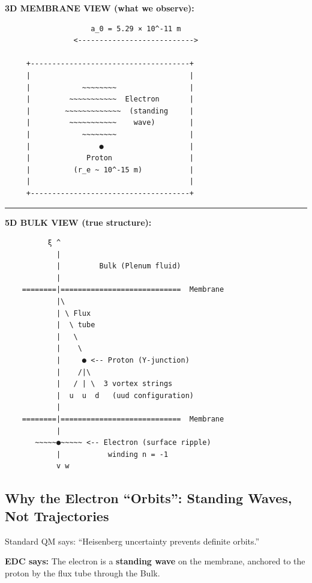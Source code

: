 \begin{tcolorbox}[colback=white,colframe=black,title=\textbf{HYDROGEN ATOM: 3D vs 5D VIEW}]

\textbf{3D MEMBRANE VIEW (what we observe):}
\begin{verbatim}
                    a_0 = 5.29 × 10^-11 m
                <--------------------------->
                
     +-------------------------------------+
     |                                     |
     |            ~~~~~~~~                 |
     |         ~~~~~~~~~~~  Electron       |
     |        ~~~~~~~~~~~~~  (standing     |
     |         ~~~~~~~~~~~    wave)        |
     |            ~~~~~~~~                 |
     |                ●                    |
     |             Proton                  |
     |          (r_e ~ 10^-15 m)           |
     |                                     |
     +-------------------------------------+
\end{verbatim}

\rule{\textwidth}{0.4pt}

\textbf{5D BULK VIEW (true structure):}
\begin{verbatim}
          ξ ^
            |
            |         Bulk (Plenum fluid)
            |
    ========|============================  Membrane
            |\
            | \ Flux
            |  \ tube
            |   \
            |    \
            |     ● <-- Proton (Y-junction)
            |    /|\
            |   / | \  3 vortex strings
            |  u  u  d   (uud configuration)
            |
    ========|============================  Membrane
            |
       ~~~~~●~~~~~ <-- Electron (surface ripple)
            |           winding n = -1
            v w
\end{verbatim}
\end{tcolorbox}

\subsection{Why the Electron ``Orbits'': Standing Waves, Not Trajectories}
\label{subsec:standing_waves}

Standard QM says: ``Heisenberg uncertainty prevents definite orbits.''

\textbf{EDC says:} The electron is a \textbf{standing wave} on the membrane, anchored to the proton by the flux tube through the Bulk.

